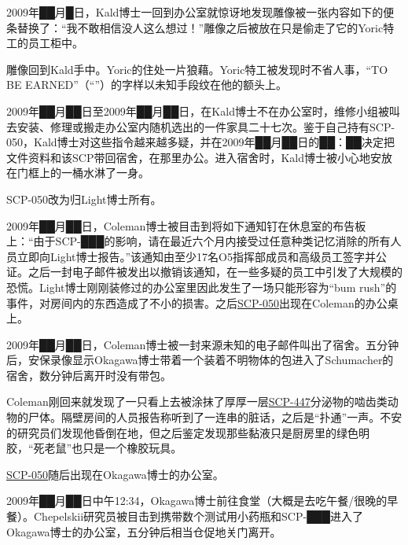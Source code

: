2009年██月█日，Kald博士一回到办公室就惊讶地发现雕像被一张内容如下的便条替换了：“我不敢相信没人这么想过！”雕像之后被放在只是偷走了它的Yoric特工的员工柜中。



雕像回到Kald手中。Yoric的住处一片狼藉。Yoric特工被发现时不省人事，“TO BE EARNED”（“”）的字样以未知手段纹在他的额头上。



2009年██月██日至2009年██月██日，在Kald博士不在办公室时，维修小组被叫去安装、修理或搬走办公室内随机选出的一件家具二十七次。鉴于自己持有SCP-050，Kald博士对这些指令越来越多疑，并在2009年██月██日的██：██决定把文件资料和该SCP带回宿舍，在那里办公。进入宿舍时，Kald博士被小心地安放在门框上的一桶水淋了一身。

SCP-050改为归Light博士所有。



2009年██月██日，Coleman博士被目击到将如下通知钉在休息室的布告板上：“由于SCP-███的影响，请在最近六个月内接受过任意种类记忆消除的所有人员立即向Light博士报告。”该通知由至少17名O5指挥部成员和高级员工签字并公证。之后一封电子邮件被发出以撤销该通知，在一些多疑的员工中引发了大规模的恐慌。Light博士刚刚装修过的办公室里因此发生了一场只能形容为“bum rush”的事件，对房间内的东西造成了不小的损害。之后\hyperref[chap:SCP-050]{SCP-050}出现在Coleman的办公桌上。



2009年██月██日，Coleman博士被一封来源未知的电子邮件叫出了宿舍。五分钟后，安保录像显示Okagawa博士带着一个装着不明物体的包进入了Schumacher的宿舍，数分钟后离开时没有带包。

Coleman刚回来就发现了一只看上去被涂抹了厚厚一层\hyperref[chap:SCP-447]{SCP-447}分泌物的啮齿类动物的尸体。隔壁房间的人员报告称听到了一连串的脏话，之后是“扑通”一声。不安的研究员们发现他昏倒在地，但之后鉴定发现那些黏液只是厨房里的绿色明胶，“死老鼠”也只是一个橡胶玩具。

\hyperref[chap:SCP-050]{SCP-050}随后出现在Okagawa博士的办公室。



2009年██月██日中午12:34，Okagawa博士前往食堂（大概是去吃午餐\slash 很晚的早餐）。Chepelskii研究员被目击到携带数个测试用小药瓶和SCP-███进入了Okagawa博士的办公室，五分钟后相当仓促地关门离开。

